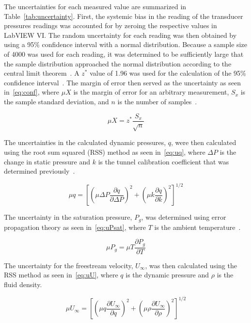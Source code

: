 \documentclass[journal,letterpaper]{IEEEtran}
\begin{document}
The uncertainties for each measured value are summarized in Table~\ref{tab:uncertainty}.
First, the systemic bias in the reading of the transducer pressures readings was accounted for by zeroing the respective values in LabVIEW VI.
The random uncertainty for each reading was then obtained by using a 95\% confidence interval with a normal distribution.
Because a sample size of 4000 was used for each reading, it was determined to be sufficiently large that the sample distribution approached the normal distribution according to the central limit theorem~\cite{MoMLecture}.
A $z^*$ value of 1.96 was used for the calculation of the 95\% confidence interval~\cite{MoMLecture}.
The margin of error then served as the uncertainty as seen in~\eqref{eq:conf}, where $\mu X$ is the margin of error for an arbitrary measurement, $S_x$ is the sample standard deviation, and $n$ is the number of samples~\cite{MoMLecture}.

\begin{equation} \label{eq:conf}
    \mu X = z^* \frac{S_x}{\sqrt{n}}
\end{equation}

The uncertainties in the calculated dynamic pressures, $q$, were then calculated using the root sum squared (RSS) method as seen in~\eqref{eq:uq}, where $\Delta P$ is the change in static pressure and $k$ is the tunnel calibration coefficient that was determined previously~\cite{MoMLecture}.

\begin{equation} \label{eq:uq}
    \mu q = \left[\left(\mu \Delta P \frac{\partial q}{\partial \Delta P}\right)^2 + \left(\mu k \frac{\partial q}{\partial k}\right)^2\right]^{1/2}
\end{equation}

The uncertainty in the saturation pressure, $P_g$, was determined using error propagation theory as seen in~\eqref{eq:uPsat}, where $T$ is the ambient temperature~\cite{errorprop}.

\begin{equation} \label{eq:uPsat}
    \mu P_g = \mu T \frac{\partial P_g}{\partial T}
\end{equation}

The uncertainty for the freestream velocity, $U_\infty$, was then calculated using the RSS method as seen in~\eqref{eq:uU}, where $q$ is the dynamic pressure and $\rho$ is the fluid density.

\begin{equation} \label{eq:uU}
    \mu U_\infty = \left[\left(\mu q \frac{\partial U_\infty}{\partial q}\right)^2 + \left(\mu \rho \frac{\partial U_\infty}{\partial \rho}\right)^2\right]^{1/2}
\end{equation}
\end{document}
